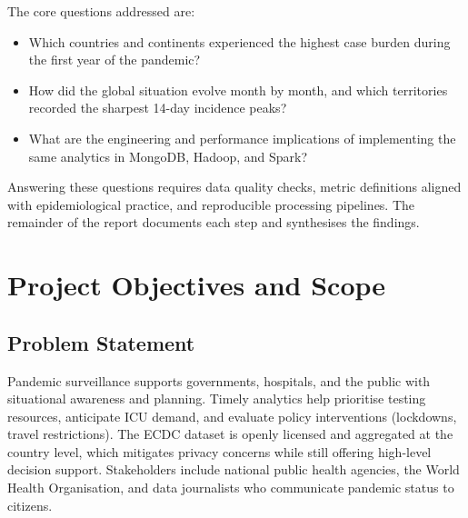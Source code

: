 \documentclass[12pt, a4paper]{article}
\begin{document}
The core questions addressed are:
\begin{itemize}[leftmargin=1.2cm]
    \item Which countries and continents experienced the highest case burden during the first year of the pandemic?
    \item How did the global situation evolve month by month, and which territories recorded the sharpest 14-day incidence peaks?
    \item What are the engineering and performance implications of implementing the same analytics in MongoDB, Hadoop, and Spark?
\end{itemize}

Answering these questions requires data quality checks, metric definitions aligned with epidemiological practice, and reproducible processing pipelines. The remainder of the report documents each step and synthesises the findings.

\section{Project Objectives and Scope}
\subsection{Problem Statement}
Pandemic surveillance supports governments, hospitals, and the public with situational awareness and planning. Timely analytics help prioritise testing resources, anticipate ICU demand, and evaluate policy interventions (lockdowns, travel restrictions). The ECDC dataset is openly licensed and aggregated at the country level, which mitigates privacy concerns while still offering high-level decision support. Stakeholders include national public health agencies, the World Health Organisation, and data journalists who communicate pandemic status to citizens.
\end{document}
